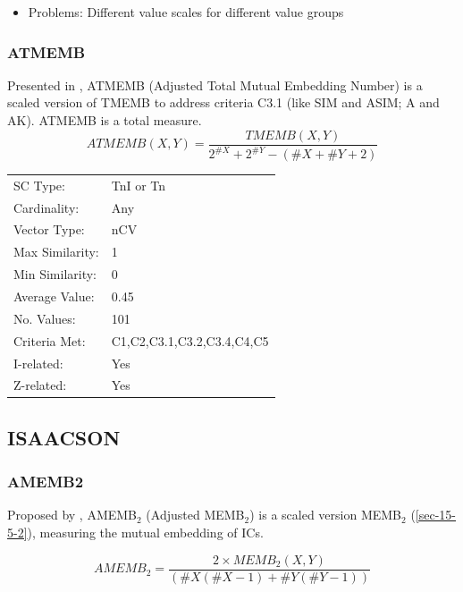 \documentclass{article}
\begin{document}
\begin{itemize}
\item Problems: Different value scales for different value groups
\end{itemize}
\subsubsection{ATMEMB}
\label{sec-15-5-4}

Presented in \citet[pp. 494]{Rahn1979}, ATMEMB (Adjusted Total Mutual
Embedding Number) is a scaled version of TMEMB to address criteria
C3.1 (like SIM and ASIM; A and AK). ATMEMB is a total measure.
$$ATMEMB\left(X,Y\right)=\frac{TMEMB\left(X,Y\right)}{2^{\#X}+2^{\#Y}-\left(\#X+\#Y+2\right)}$$

\begin{center}
\begin{tabular}{ll}
 SC Type:         &  TnI or Tn                   \\
 Cardinality:     &  Any                         \\
 Vector Type:     &  nCV                         \\
 Max Similarity:  &  1                           \\
 Min Similarity:  &  0                           \\
 Average Value:   &  0.45                        \\
 No. Values:      &  101                         \\
 Criteria Met:    &  C1,C2,C3.1,C3.2,C3.4,C4,C5  \\
 I-related:       &  Yes                         \\
 Z-related:       &  Yes                         \\
\end{tabular}
\end{center}
\subsection{ISAACSON}
\label{sec-15-6}
\subsubsection{AMEMB2}
\label{sec-15-6-1}

Proposed by \citet[pp. 8]{Isaacson1990}, AMEMB$_{2}$ (Adjusted MEMB$_{2}$)
is a scaled version MEMB$_{2}$ (\ref{sec-15-5-2}), measuring the mutual
embedding of ICs.

$$AMEMB_{2}=\frac{2 \times
MEMB_{2}(X,Y)}{\left(\#X\left(\#X-1\right)+\#Y\left(\#Y-1\right)\right)}$$
\end{document}
